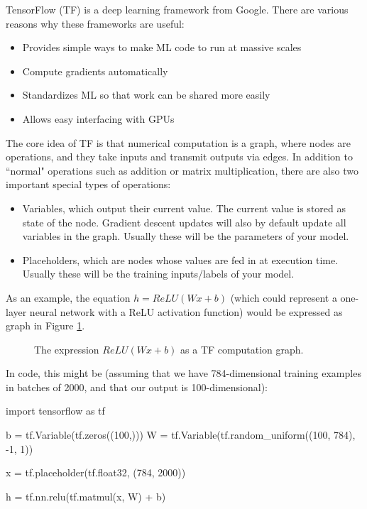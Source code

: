 TensorFlow (TF) is a deep learning framework from Google. There are various reasons why these frameworks are useful:
\begin{itemize}
\item Provides simple ways to make ML code to run at massive scales
\item Compute gradients automatically
\item Standardizes ML so that work can be shared more easily
\item Allows easy interfacing with GPUs
\end{itemize}
The core idea of TF is that numerical computation is a graph, where nodes are operations, and they take inputs and transmit outputs via edges. In addition to ``normal" operations such as addition or matrix multiplication, there are also two important special types of operations:
\begin{itemize}
\item Variables, which output their current value. The current value is stored as state of the node. Gradient descent updates will also by default update all variables in the graph. Usually these will be the parameters of your model.
\item Placeholders, which are nodes whose values are fed in at execution time. Usually these will be the training inputs/labels of your model.
\end{itemize}
As an example, the equation $h = ReLU(Wx + b)$ (which could represent a one-layer neural network with a ReLU activation function) would be expressed as graph in Figure \ref{fig7-1}.
\begin{figure}
\centering
{}
\caption{The expression $ReLU(Wx + b)$ as a TF computation graph.} \label{fig7-1}
\end{figure}
In code, this might be (assuming that we have 784-dimensional training examples in batches of 2000, and that our output is 100-dimensional):
\begin{python}
import tensorflow as tf

b = tf.Variable(tf.zeros((100,)))
W = tf.Variable(tf.random_uniform((100, 784), -1, 1))

x = tf.placeholder(tf.float32, (784, 2000))

h = tf.nn.relu(tf.matmul(x, W) + b)
\end{python}

